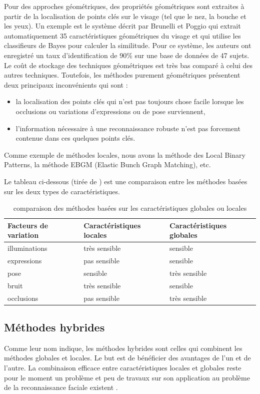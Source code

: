 Pour des approches géométriques, des propriétés géométriques sont extraites à partir de la localisation de points clés sur le visage (tel que le nez, la bouche et les yeux).
Un exemple est le système décrit par Brunelli et Poggio \citep{BRU}  qui extrait automatiquement 35 caractéristiques géométriques du visage et qui utilise les classifieurs de Bayes pour calculer la similitude. Pour ce système, les auteurs ont enregistré un taux d'identification de 90\% sur une base de données de 47 sujets. Le  coût  de  stockage  des  techniques géométriques est très bas comparé à celui des autres techniques. Toutefois, les méthodes purement géométriques présentent deux principaux inconvénients qui sont :
\begin{itemize}
	\item la localisation des points clés qui n'est pas toujours chose facile lorsque les occlusions ou variations d'expressions ou de pose surviennent,
	\item  l'information nécessaire à une reconnaissance robuste n'est pas forcement contenue dans ces quelques points clés.
\end{itemize}

Comme exemple de méthodes locales, nous avons la méthode des Local Binary Patterns, la méthode EBGM \cite{EBGM} (Elastic Bunch Graph Matching), etc.

Le tableau ci-dessous (tirée de \cite{Sou12}) est une comparaison entre les méthodes basées sur les deux types de caractéristiques.
\begin{table}[htbp]
	\centering
		\begin{tabular}{|l|l|l|}
			\hline
			Facteurs de variation & Caractéristiques locales& Caractéristiques globales\\
			\hline illuminations & très sensible& sensible\\
			\hline expressions & pas sensible& sensible\\
			\hline pose & sensible& très sensible\\
			\hline bruit & très sensible& sensible\\
			\hline occlusions & pas sensible& très sensible\\
			\hline
		\end{tabular}
	\caption{comparaison des méthodes basées sur les caractéristiques globales ou locales} 
	\label{tab:comparaison}
\end{table}
\subsection{Méthodes hybrides}
Comme leur nom indique, les méthodes hybrides sont celles qui combinent les méthodes globales et locales. Le but est de bénéficier des avantages de l'un et de l'autre. La combinaison efficace entre caractéristiques locales et globales reste pour le moment un problème et peu de travaux sur son application au problème de la reconnaissance faciale existent \citep{XIAO}.

